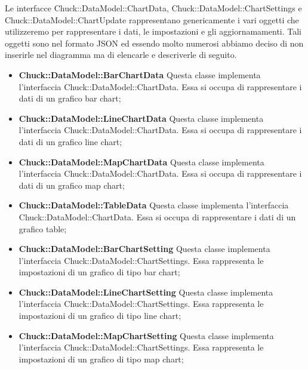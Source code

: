 	Le interfacce Chuck::DataModel::ChartData, Chuck::DataModel::ChartSettings e \linebreak Chuck::DataModel::ChartUpdate rappresentano genericamente i vari oggetti che utilizzeremo per rappresentare i dati, le impostazioni e gli aggiornamamenti. Tali oggetti sono nel formato JSON ed essendo molto numerosi abbiamo deciso di non inserirle nel diagramma ma di elencarle e descriverle di seguito.

	\begin{itemize}
		\item \textbf{Chuck::DataModel::BarChartData} Questa classe implementa l'interfaccia \linebreak Chuck::DataModel::ChartData. Essa si occupa di rappresentare i dati di un grafico bar chart;

		\item \textbf{Chuck::DataModel::LineChartData} Questa classe implementa l'interfaccia \linebreak Chuck::DataModel::ChartData. Essa si occupa di rappresentare i dati di un grafico line chart;

		\item \textbf{Chuck::DataModel::MapChartData} Questa classe implementa l'interfaccia \linebreak Chuck::DataModel::ChartData. Essa si occupa di rappresentare i dati di un grafico map chart;

		\item \textbf{Chuck::DataModel::TableData} Questa classe implementa l'interfaccia \linebreak Chuck::DataModel::ChartData. Essa si occupa di rappresentare i dati di un grafico table;

		\item \textbf{Chuck::DataModel::BarChartSetting} Questa classe implementa l'interfaccia \linebreak Chuck::DataModel::ChartSettings. Essa rappresenta le impostazioni di un grafico di tipo bar chart;

		\item \textbf{Chuck::DataModel::LineChartSetting} Questa classe implementa l'interfaccia \linebreak Chuck::DataModel::ChartSettings. Essa rappresenta le impostazioni di un grafico di tipo line chart;

		\item \textbf{Chuck::DataModel::MapChartSetting} Questa classe implementa l'interfaccia \linebreak Chuck::DataModel::ChartSettings. Essa rappresenta le impostazioni di un grafico di tipo map chart;


\end{itemize}
